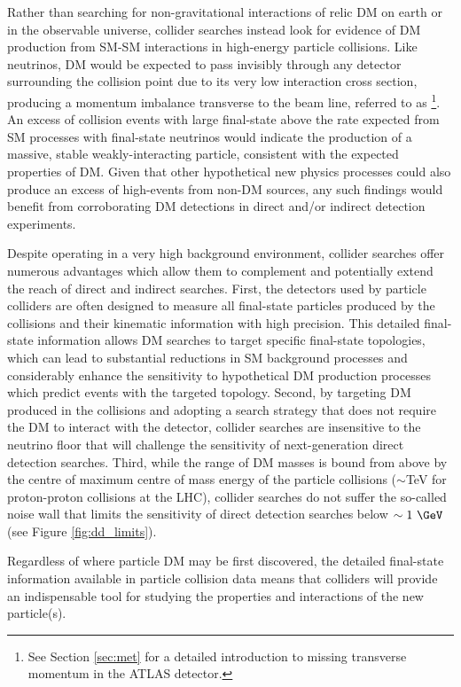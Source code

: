 Rather than searching for non-gravitational interactions of relic DM on earth or in the observable universe, collider searches \cite{DM_colliders} instead look for evidence of DM production from SM-SM interactions in high-energy particle collisions. Like neutrinos, DM would be expected to pass invisibly through any detector surrounding the collision point due to its very low interaction cross section, producing a momentum imbalance transverse to the beam line, referred to as \met\footnote{See Section \ref{sec:met} for a detailed introduction to missing transverse momentum in the ATLAS detector.}. An excess of collision events with large final-state \met above the rate expected from SM processes with final-state neutrinos would indicate the production of a massive, stable weakly-interacting particle, consistent with the expected properties of DM. Given that other hypothetical new physics processes \cite{add_1998,dark_energy_lhc} could also produce an excess of high-\met events from non-DM sources, any such findings would benefit from corroborating DM detections in direct and/or indirect detection experiments.

Despite operating in a very high background environment, collider searches offer numerous advantages which allow them to complement and potentially extend the reach of direct and indirect searches. First, the detectors used by particle colliders are often designed to measure all final-state particles produced by the collisions and their kinematic information with high precision. This detailed final-state information allows DM searches to target specific final-state topologies, which can lead to substantial reductions in SM background processes and considerably enhance the sensitivity to hypothetical DM production processes which predict events with the targeted topology. Second, by targeting DM produced in the collisions and adopting a search strategy that does not require the DM to interact with the detector, collider searches are insensitive to the neutrino floor that will challenge the sensitivity of next-generation direct detection searches. Third, while the range of DM masses is bound from above by the centre of maximum centre of mass energy of the particle collisions (\(\sim\)TeV for proton-proton collisions at the LHC), collider searches do not suffer the so-called noise  wall that limits the sensitivity of direct detection searches below \(\sim1~\GeV\) (see Figure \ref{fig:dd_limits}).

Regardless of where particle DM may be first discovered, the detailed final-state information available in particle collision data means that colliders will provide an indispensable tool for studying the properties and interactions of the new particle(s).

